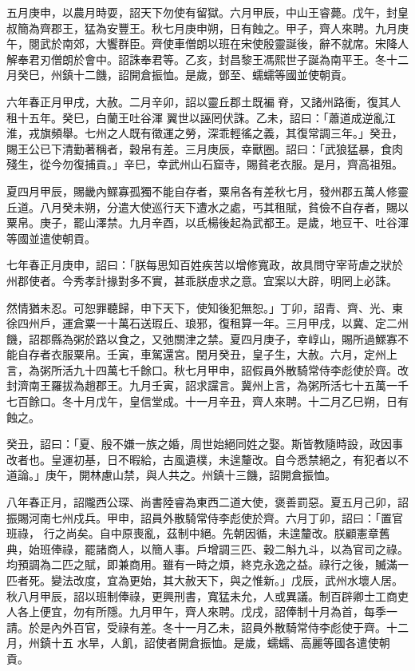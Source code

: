 \begin{pinyinscope}
 五月庚申，以農月時耍，詔天下勿使有留獄。六月甲辰，中山王睿薨。戊午，封皇叔簡為齊郡王，猛為安豐王。秋七月庚申朔，日有蝕之。甲子，齊人來聘。九月庚午，閱武於南郊，大饗群臣。齊使車僧朗以班在宋使殷靈誕後，辭不就席。宋降人解奉君刃僧朗於會中。詔誅奉君等。乙亥，封昌黎王馮熙世子誕為南平王。冬十二月癸巳，州鎮十二饑，詔開倉振恤。是歲，鄧至、蠕蠕等國並使朝貢。



 六年春正月甲戌，大赦。二月辛卯，詔以靈丘郡土既褊脊，又諸州路衝，復其人租十五年。癸巳，白蘭王吐谷渾
 翼世以誣罔伏誅。乙未，詔曰：「蕭道成逆亂江淮，戎旗頻舉。七州之人既有徵運之勞，深乖輕徭之義，其復常調三年。」癸丑，賜王公已下清勤著稱者，穀帛有差。三月庚辰，幸獸圈。詔曰：「武狼猛暴，食肉殘生，從今勿復捕貢。」辛巳，幸武州山石窟寺，賜貧老衣服。是月，齊高祖殂。



 夏四月甲辰，賜畿內鰥寡孤獨不能自存者，粟帛各有差秋七月，發州郡五萬人修靈丘道。八月癸未朔，分遣大使巡行天下遭水之處，丐其租賦，貧儉不自存者，賜以粟帛。庚子，罷山澤禁。九月辛酉，以氐楊後起為武都王。是歲，地豆干、吐谷渾等國並遣使朝貢。



 七年春正月庚申，詔曰：「朕每思知百姓疾苦以增修寬政，故具問守宰苛虐之狀於州郡使者。今秀孝計掾對多不實，甚乖朕虛求之意。宜案以大辟，明罔上必誅。



 然情猶未忍。可恕罪聽歸，申下天下，使知後犯無恕。」丁卯，詔青、齊、光、東徐四州戶，運倉粟一十萬石送瑕丘、琅邪，復租算一年。三月甲戌，以冀、定二州饑，詔郡縣為粥於路以食之，又弛關津之禁。夏四月庚子，幸崞山，賜所過鰥寡不能自存者衣服粟帛。壬寅，車駕還宮。閏月癸丑，皇子生，大赦。六月，定州上言，為粥所活九十四萬七千餘口。秋七月甲申，詔假員外散騎常侍李彪使於齊。改
 封濟南王羅拔為趙郡王。九月壬寅，詔求讜言。冀州上言，為粥所活七十五萬一千七百餘口。冬十月戊午，皇信堂成。十一月辛丑，齊人來聘。十二月乙巳朔，日有蝕之。



 癸丑，詔曰：「夏、殷不嫌一族之婚，周世始絕同姓之娶。斯皆教隨時設，政因事改者也。皇運初基，日不暇給，古風遺樸，未遑釐改。自今悉禁絕之，有犯者以不道論。」庚午，開林慮山禁，與人共之。州鎮十三饑，詔開倉振恤。



 八年春正月，詔隴西公琛、尚書陸睿為東西二道大使，褒善罰惡。夏五月己卯，詔振賜河南七州戍兵。甲申，詔員外散騎常侍李彪使於齊。六月丁卯，詔曰：「置官班祿，
 行之尚矣。自中原喪亂，茲制中絕。先朝因循，未遑釐改。朕顧憲章舊典，始班俸祿，罷諸商人，以簡人事。戶增調三匹、穀二斛九斗，以為官司之祿。均預調為二匹之賦，即兼商用。雖有一時之煩，終克永逸之益。祿行之後，贓滿一匹者死。變法改度，宜為更始，其大赦天下，與之惟新。」戊辰，武州水壞人居。秋八月甲辰，詔以班制俸祿，更興刑書，寬猛未允，人或異議。制百辟卿士工商吏人各上便宜，勿有所隱。九月甲午，齊人來聘。戊戌，詔俸制十月為首，每季一請。於是內外百官，受祿有差。冬十一月乙未，詔員外散騎常侍李彪使于齊。十二月，州鎮十五
 水旱，人飢，詔使者開倉振恤。是歲，蠕蠕、高麗等國各遣使朝貢。




\end{pinyinscope}
